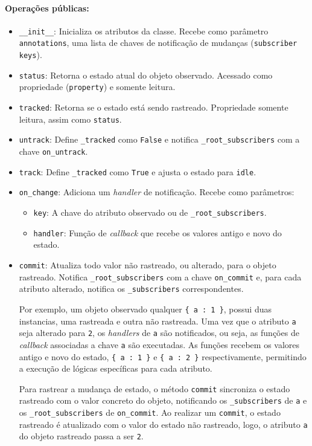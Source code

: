 \paragraph{Operações públicas:}
\begin{itemize}
    \item \texttt{\_\_init\_\_}: Inicializa os atributos da classe. Recebe como parâmetro \texttt{annotations}, uma lista de chaves de notificação de mudanças (\texttt{subscriber keys}).
    \item \texttt{status}: Retorna o estado atual do objeto observado. Acessado como propriedade (\texttt{property}) e somente leitura.
    \item \texttt{tracked}: Retorna se o estado está sendo rastreado. Propriedade somente leitura, assim como \texttt{status}.
    \item \texttt{untrack}: Define \texttt{\_tracked} como \texttt{False} e notifica \texttt{\_root\_subscribers} com a chave \texttt{on\_untrack}.
    \item \texttt{track}: Define \texttt{\_tracked} como \texttt{True} e ajusta o estado para \texttt{idle}.
    \item \texttt{on\_change}: Adiciona um \textit{handler} de notificação. Recebe como parâmetros:
    \begin{itemize}
        \item \texttt{key}: A chave do atributo observado ou de \texttt{\_root\_subscribers}.
        \item \texttt{handler}: Função de \textit{callback} que recebe os valores antigo e novo do estado.
    \end{itemize}
    \item \texttt{commit}: Atualiza todo valor não rastreado, ou alterado, para o objeto rastreado. Notifica \texttt{\_root\_subscribers} com a chave \texttt{on\_commit} e, para cada atributo alterado, notifica os \texttt{\_subscribers} correspondentes.

    \hfill \break

    Por exemplo, um objeto observado qualquer \verb|{ a : 1 }|, possui duas instancias, uma rastreada e outra não rastreada. Uma vez que o atributo \texttt{a} seja alterado para \texttt{2}, os \textit{handlers} de \texttt{a} são notificados, ou seja, as funções de \textit{callback} associadas a chave \texttt{a} são executadas. As funções recebem os valores antigo e novo do estado, \verb|{ a : 1 }| e \verb|{ a : 2 }| respectivamente, permitindo a execução de lógicas específicas para cada atributo.

    Para rastrear a mudança de estado, o método \texttt{commit} sincroniza o estado rastreado com o valor concreto do objeto, notificando os \texttt{\_subscribers} de \texttt{a} e os \texttt{\_root\_subscribers} de \texttt{on\_commit}. Ao realizar um \texttt{commit}, o estado rastreado é atualizado com o valor do estado não rastreado, logo, o atributo \texttt{a} do objeto rastreado passa a ser \texttt{2}.
\end{itemize}

